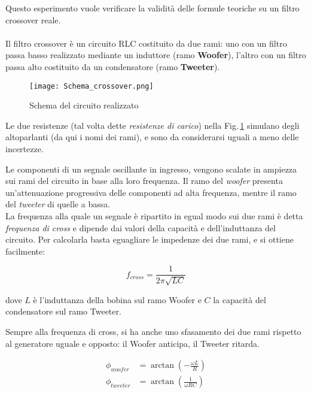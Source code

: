 \documentclass[../Relazione_circuiti]{subfiles}
\begin{document}
Questo esperimento vuole verificare la validità delle formule teoriche su un filtro crossover reale. \\ \\
Il filtro crossover è un circuito RLC costituito da due rami: uno con un filtro passa basso realizzato mediante un
induttore (ramo \textbf{Woofer}), l'altro con un filtro passa alto costituito da un condensatore (ramo
\textbf{Tweeter}).

\begin{figure}[H]
  \centering
  \texttt{[image: Schema\_crossover.png]}

  \caption{Schema del circuito realizzato}
  \label{fig:schema_circuito}

\end{figure}

Le due resistenze (tal volta dette \textit{resistenze di carico}) nella Fig.\,\ref{fig:schema_circuito} simulano degli
altoparlanti (da qui i nomi dei rami), e sono da considerarsi uguali a meno delle incertezze.

Le componenti di un segnale oscillante in ingresso, vengono scalate in ampiezza sui rami del circuito in base alla loro
frequenza.
Il ramo del \textit{woofer} presenta un'attenuazione progressiva delle componenti ad alta frequenza, mentre il ramo
del \textit{tweeter} di quelle a bassa.\\
La frequenza alla quale un segnale è ripartito in egual modo sui due rami è detta \textit{frequenza di cross} e dipende
dai valori della capacità e dell'induttanza del circuito.
Per calcolarla basta eguagliare le impedenze dei due rami, e si ottiene facilmente:

\begin{equation}
  \label{eq:f_cross}
  f_{cross} = \frac{1}{2 \pi \sqrt{LC} }
\end{equation}

dove $L$ è l'induttanza della bobina sul ramo Woofer e $C$ la capacità del condensatore sul ramo Tweeter.

Sempre alla frequenza di cross, si ha anche uno sfasamento dei due rami rispetto al generatore uguale e opposto: il
Woofer anticipa, il Tweeter ritarda.

\begin{align}
  \phi_{woofer} &= \arctan(-\frac{\omega L}{R}) \label{eq:p_woofer} \\
  \phi_{tweeter} &= \arctan(\frac{1}{\omega RC}) \label{eq:p_tweeter}
\end{align}
\end{document}
